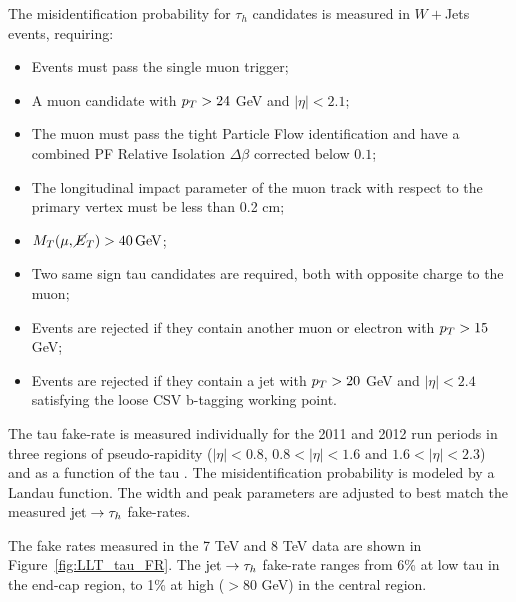 The misidentification probability for $\tau_h$ candidates is measured in $W+$Jets events, requiring:
\begin{itemize}
\item Events must pass the single muon trigger;
\item A muon candidate with $p_{T} > 24$ GeV and $|\eta| < 2.1$;
\item The muon must pass the tight Particle Flow identification and have a combined PF Relative Isolation $\Delta \beta $ corrected below $0.1$;
\item The longitudinal impact parameter of the muon track with respect to the primary vertex must be less than 0.2 cm;
\item $M_{T}(\mu, \cancel{E}_T) > 40\, \mathrm{GeV}$;
\item Two same sign tau candidates are required, both with opposite charge to the muon;
\item Events are rejected if they contain another muon or electron with $p_{T} > 15$ GeV;
\item Events are rejected if they contain a jet with $p_{T} > 20$ GeV and $|\eta|< 2.4$ satisfying the loose CSV b-tagging working point.
\end{itemize}
The tau fake-rate is measured individually for the 2011 and 2012 run periods in three regions of pseudo-rapidity ($|\eta|<0.8$,
\mbox{$0.8<|\eta|<1.6$} and $1.6<|\eta|<2.3$) and as a function of the tau \pT. The misidentification probability is modeled by a Landau function. %
The width and peak parameters are adjusted to best match the measured $\mathrm{jet}\rightarrow\tau_h$ fake-rates.

The fake rates measured in the %
7 TeV and 8 TeV data are shown in Figure~\ref{fig:LLT_tau_FR}. The $\mathrm{jet}\rightarrow\tau_h$ fake-rate %
ranges from 6\% at low tau \pT in the end-cap region, to 1\% at high \pT ($ > 80$ GeV) in the central region.

